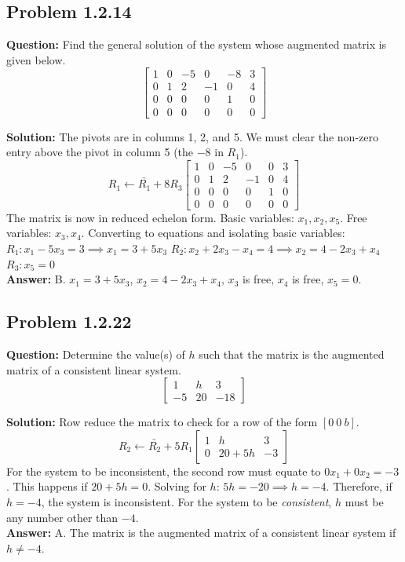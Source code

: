 \documentclass[11pt]{article}
\begin{document}
\subsection*{Problem 1.2.14}
\textbf{Question:} Find the general solution of the system whose augmented matrix is given below.
\[ \begin{bmatrix} 1 & 0 & -5 & 0 & -8 & 3 \\ 0 & 1 & 2 & -1 & 0 & 4 \\ 0 & 0 & 0 & 0 & 1 & 0 \\ 0 & 0 & 0 & 0 & 0 & 0 \end{bmatrix} \]

\textbf{Solution:}
The pivots are in columns 1, 2, and 5. We must clear the non-zero entry above the pivot in column 5 (the $-8$ in $R_1$).
\[ \underrightarrow{R_1 \leftarrow R_1 + 8R_3} \begin{bmatrix} 1 & 0 & -5 & 0 & 0 & 3 \\ 0 & 1 & 2 & -1 & 0 & 4 \\ 0 & 0 & 0 & 0 & 1 & 0 \\ 0 & 0 & 0 & 0 & 0 & 0 \end{bmatrix} \]
The matrix is now in reduced echelon form.
Basic variables: $x_1, x_2, x_5$. Free variables: $x_3, x_4$.
Converting to equations and isolating basic variables:
$R_1: x_1 - 5x_3 = 3 \implies x_1 = 3 + 5x_3$
$R_2: x_2 + 2x_3 - x_4 = 4 \implies x_2 = 4 - 2x_3 + x_4$
$R_3: x_5 = 0$
\\
\textbf{Answer:} B. $x_1 = 3 + 5x_3$, $x_2 = 4 - 2x_3 + x_4$, $x_3$ is free, $x_4$ is free, $x_5 = 0$.


\subsection*{Problem 1.2.22}
\textbf{Question:} Determine the value(s) of $h$ such that the matrix is the augmented matrix of a consistent linear system.
\[ \begin{bmatrix} 1 & h & 3 \\ -5 & 20 & -18 \end{bmatrix} \]

\textbf{Solution:}
Row reduce the matrix to check for a row of the form $[0 \ 0 \ b]$.
\[ \underrightarrow{R_2 \leftarrow R_2 + 5R_1} \begin{bmatrix} 1 & h & 3 \\ 0 & 20 + 5h & -3 \end{bmatrix} \]
For the system to be inconsistent, the second row must equate to $0x_1 + 0x_2 = -3$. This happens if $20 + 5h = 0$.
Solving for $h$: $5h = -20 \implies h = -4$.
Therefore, if $h = -4$, the system is inconsistent. For the system to be \textit{consistent}, $h$ must be any number other than $-4$.
\\
\textbf{Answer:} A. The matrix is the augmented matrix of a consistent linear system if $h \neq -4$.
\end{document}
